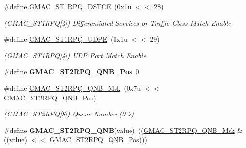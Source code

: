 \begin{DoxyCompactItemize}
\item 
\mbox{\label{group__SAME70__GMAC_ga042f6289579971220bd2d7b47789e709}} 
\#define \mbox{\hyperlink{group__SAME70__GMAC_ga042f6289579971220bd2d7b47789e709}{G\+M\+A\+C\+\_\+\+S\+T1\+R\+P\+Q\+\_\+\+D\+S\+T\+CE}}~(0x1u $<$$<$ 28)
\begin{DoxyCompactList}\small\item\em (G\+M\+A\+C\+\_\+\+S\+T1\+R\+PQ\mbox{[}4\mbox{]}) Differentiated Services or Traffic Class Match Enable \end{DoxyCompactList}\item 
\mbox{\label{group__SAME70__GMAC_ga172c3438c9a3bc9abc2ac43c1e866fe6}} 
\#define \mbox{\hyperlink{group__SAME70__GMAC_ga172c3438c9a3bc9abc2ac43c1e866fe6}{G\+M\+A\+C\+\_\+\+S\+T1\+R\+P\+Q\+\_\+\+U\+D\+PE}}~(0x1u $<$$<$ 29)
\begin{DoxyCompactList}\small\item\em (G\+M\+A\+C\+\_\+\+S\+T1\+R\+PQ\mbox{[}4\mbox{]}) U\+DP Port Match Enable \end{DoxyCompactList}\item 
\mbox{\label{group__SAME70__GMAC_gab93af9a79fe83b97ddf07cf4d486233c}} 
\#define {\bfseries G\+M\+A\+C\+\_\+\+S\+T2\+R\+P\+Q\+\_\+\+Q\+N\+B\+\_\+\+Pos}~0
\item 
\mbox{\label{group__SAME70__GMAC_ga121ddbbfd4f7c96bd510312eccf21f4d}} 
\#define \mbox{\hyperlink{group__SAME70__GMAC_ga121ddbbfd4f7c96bd510312eccf21f4d}{G\+M\+A\+C\+\_\+\+S\+T2\+R\+P\+Q\+\_\+\+Q\+N\+B\+\_\+\+Msk}}~(0x7u $<$$<$ G\+M\+A\+C\+\_\+\+S\+T2\+R\+P\+Q\+\_\+\+Q\+N\+B\+\_\+\+Pos)
\begin{DoxyCompactList}\small\item\em (G\+M\+A\+C\+\_\+\+S\+T2\+R\+PQ\mbox{[}8\mbox{]}) Queue Number (0-\/2) \end{DoxyCompactList}\item 
\mbox{\label{group__SAME70__GMAC_gad2a762e79fb3ffe818fd91b6bac829f0}} 
\#define {\bfseries G\+M\+A\+C\+\_\+\+S\+T2\+R\+P\+Q\+\_\+\+Q\+NB}(value)~((\mbox{\hyperlink{group__SAMV71__GMAC_ga121ddbbfd4f7c96bd510312eccf21f4d}{G\+M\+A\+C\+\_\+\+S\+T2\+R\+P\+Q\+\_\+\+Q\+N\+B\+\_\+\+Msk}} \& ((value) $<$$<$ G\+M\+A\+C\+\_\+\+S\+T2\+R\+P\+Q\+\_\+\+Q\+N\+B\+\_\+\+Pos)))

\end{DoxyCompactItemize}
